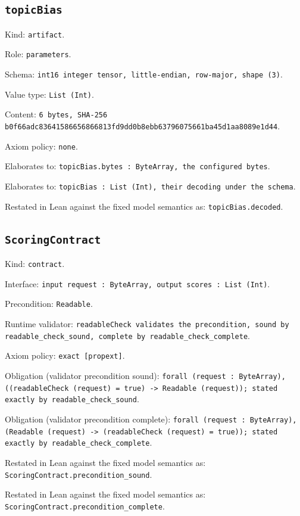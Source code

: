 \documentclass[11pt]{article}
\begin{document}
\subsection*{\texttt{topicBias}}
\noindent Kind: \texttt{artifact}.\par
\noindent Role: \texttt{parameters}.\par
\noindent Schema: \texttt{int16 integer tensor, little-endian, row-major, shape (3)}.\par
\noindent Value type: \texttt{List (Int)}.\par
\noindent Content: \texttt{6 bytes, SHA-256 b0f66adc83641586656866813fd9dd0b8ebb63796075661ba45d1aa8089e1d44}.\par
\noindent Axiom policy: \texttt{none}.\par
\noindent Elaborates to: \texttt{topicBias.bytes : ByteArray, the configured bytes}.\par
\noindent Elaborates to: \texttt{topicBias : List (Int), their decoding under the schema}.\par
\noindent Restated in Lean against the fixed model semantics as: \texttt{topicBias.decoded}.\par
\subsection*{\texttt{ScoringContract}}
\noindent Kind: \texttt{contract}.\par
\noindent Interface: \texttt{input request : ByteArray, output scores : List (Int)}.\par
\noindent Precondition: \texttt{Readable}.\par
\noindent Runtime validator: \texttt{readableCheck validates the precondition, sound by readable\_check\_sound, complete by readable\_check\_complete}.\par
\noindent Axiom policy: \texttt{exact [propext]}.\par
\noindent Obligation (validator precondition sound): \texttt{forall (request : ByteArray), ((readableCheck (request) = true) -> Readable (request)); stated exactly by readable\_check\_sound}.\par
\noindent Obligation (validator precondition complete): \texttt{forall (request : ByteArray), (Readable (request) -> (readableCheck (request) = true)); stated exactly by readable\_check\_complete}.\par
\noindent Restated in Lean against the fixed model semantics as: \texttt{ScoringContract.precondition\_sound}.\par
\noindent Restated in Lean against the fixed model semantics as: \texttt{ScoringContract.precondition\_complete}.\par
\end{document}
